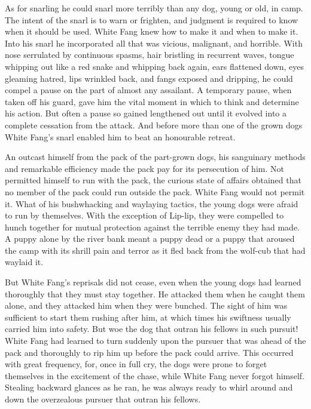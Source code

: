 \documentclass[10pt]{book}
\begin{document}
As for snarling he could snarl more terribly than any dog, young or
old, in camp. The intent of the snarl is to warn or frighten, and
judgment is required to know when it should be used. White Fang knew
how to make it and when to make it. Into his snarl he incorporated all
that was vicious, malignant, and horrible. With nose serrulated by
continuous spasms, hair bristling in recurrent waves, tongue whipping
out like a red snake and whipping back again, ears flattened down, eyes
gleaming hatred, lips wrinkled back, and fangs exposed and dripping, he
could compel a pause on the part of almost any assailant. A temporary
pause, when taken off his guard, gave him the vital moment in which to
think and determine his action. But often a pause so gained lengthened
out until it evolved into a complete cessation from the attack. And
before more than one of the grown dogs White Fang’s snarl enabled him
to beat an honourable retreat.

An outcast himself from the pack of the part-grown dogs, his sanguinary
methods and remarkable efficiency made the pack pay for its persecution
of him. Not permitted himself to run with the pack, the curious state
of affairs obtained that no member of the pack could run outside the
pack. White Fang would not permit it. What of his bushwhacking and
waylaying tactics, the young dogs were afraid to run by themselves.
With the exception of Lip-lip, they were compelled to hunch together
for mutual protection against the terrible enemy they had made. A puppy
alone by the river bank meant a puppy dead or a puppy that aroused the
camp with its shrill pain and terror as it fled back from the wolf-cub
that had waylaid it.

But White Fang’s reprisals did not cease, even when the young dogs had
learned thoroughly that they must stay together. He attacked them when
he caught them alone, and they attacked him when they were bunched. The
sight of him was sufficient to start them rushing after him, at which
times his swiftness usually carried him into safety. But woe the dog
that outran his fellows in such pursuit! White Fang had learned to turn
suddenly upon the pursuer that was ahead of the pack and thoroughly to
rip him up before the pack could arrive. This occurred with great
frequency, for, once in full cry, the dogs were prone to forget
themselves in the excitement of the chase, while White Fang never
forgot himself. Stealing backward glances as he ran, he was always
ready to whirl around and down the overzealous pursuer that outran his
fellows.
\end{document}
